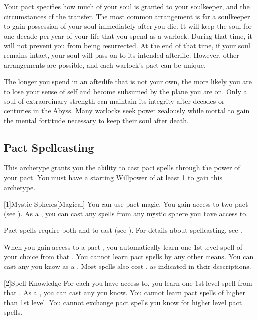         Your pact specifies how much of your soul is granted to your soulkeeper, and the circumstances of the transfer.
        The most common arrangement is for a soulkeeper to gain possession of your soul immediately after you die.
        It will keep the soul for one decade per year of your life that you spend as a warlock.
        During that time, it will not prevent you from being resurrected.
        At the end of that time, if your soul remains intact, your soul will pass on to its intended afterlife.
        However, other arrangements are possible, and each warlock's pact can be unique.

        The longer you spend in an afterlife that is not your own, the more likely you are to lose your sense of self and become subsumed by the plane you are on.
        Only a soul of extraordinary strength can maintain its integrity after decades or centuries in the Abyss.
        Many warlocks seek power zealously while mortal to gain the mental fortitude necessary to keep their soul after death.

    \subsection{Pact Spellcasting}
        This archetype grants you the ability to cast pact spells through the power of your pact.
        You must have a starting Willpower of at least 1 to gain this archetype.

        [1]{Mystic Spheres}[Magical]
        You can use pact magic.
        You gain access to two pact  (see ).
        As a , you can cast any  spells from any mystic sphere you have access to.

        Pact spells require both  and  to cast (see ).
        For details about spellcasting, see .

        When you gain access to a pact , you automatically learn one 1st level spell of your choice from that .
        You cannot learn pact spells by any other means.
        You can cast any  you know as a .
        Most spells also cost , as indicated in their descriptions.

        [2]{Spell Knowledge}
        For each  you have access to, you learn one 1st level spell from that .
        As a , you can cast any  you know.
        You cannot learn pact spells of higher than 1st level.
        You cannot exchange pact spells you know for higher level pact spells.

